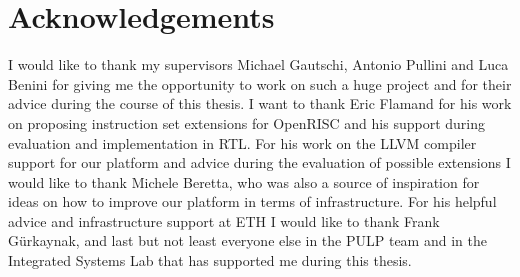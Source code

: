 
\chapter*{Acknowledgements}

I would like to thank my supervisors Michael Gautschi, Antonio Pullini and Luca
Benini for giving me the opportunity to work on such a huge project and for
their advice during the course of this thesis.
I want to thank Eric Flamand for his work on proposing instruction set
extensions for OpenRISC and his support during evaluation and implementation in
RTL.
For his work on the LLVM compiler support for our platform and advice during
the evaluation of possible extensions I would like to thank Michele Beretta,
who was also a source of inspiration for ideas on how to improve our platform
in terms of infrastructure.
For his helpful advice and infrastructure support at ETH I would like to thank
Frank G\"urkaynak,
and last but not least everyone else in the PULP team and in the Integrated
Systems Lab that has supported me during this thesis.
